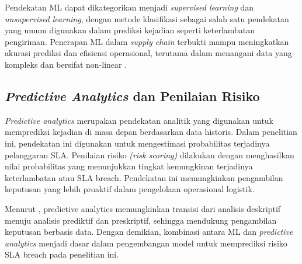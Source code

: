 Pendekatan ML dapat dikategorikan menjadi \textit{supervised learning} dan \textit{unsupervised learning}, dengan metode klasifikasi sebagai salah satu pendekatan yang umum digunakan dalam prediksi kejadian seperti keterlambatan pengiriman. Penerapan ML dalam \textit{supply chain} terbukti mampu meningkatkan akurasi prediksi dan efisiensi operasional, terutama dalam menangani data yang kompleks dan bersifat non-linear \citep{article:carbonneau2008}.

\subsection{\textit{Predictive Analytics} dan Penilaian Risiko}
\textit{Predictive analytics} merupakan pendekatan analitik yang digunakan untuk memprediksi kejadian di masa depan berdasarkan data historis. Dalam penelitian ini, pendekatan ini digunakan untuk mengestimasi probabilitas terjadinya pelanggaran SLA. Penilaian risiko \textit{(risk scoring)} dilakukan dengan menghasilkan nilai probabilitas yang menunjukkan tingkat kemungkinan terjadinya keterlambatan atau SLA breach. Pendekatan ini memungkinkan pengambilan keputusan yang lebih proaktif dalam pengelolaan operasional logistik.

Menurut \cite{article:bertsimas2020}, predictive analytics memungkinkan transisi dari analisis deskriptif menuju analisis prediktif dan preskriptif, sehingga mendukung pengambilan keputusan berbasis data. Dengan demikian, kombinasi antara ML dan \textit{predictive analytics} menjadi dasar dalam pengembangan model untuk memprediksi risiko SLA breach pada penelitian ini.

